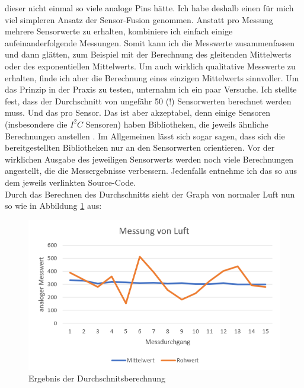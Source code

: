 \documentclass[10pt]{article}
\begin{document}
dieser nicht einmal so viele analoge Pins hätte. Ich habe deshalb einen für mich viel simpleren Ansatz der Sensor-Fusion genommen. Anstatt pro Messung mehrere Sensorwerte
zu erhalten, kombiniere ich einfach einige aufeinanderfolgende Messungen. Somit kann ich die Messwerte zusammenfassen und dann glätten, zum Beispiel mit der Berechnung des gleitenden Mittelwerts
oder des exponentiellen Mittelwerts. Um auch wirklich qualitative Messwerte zu erhalten, finde ich aber die Berechnung eines einzigen Mittelwerts  sinnvoller. Um das Prinzip in der Praxis zu testen, 
unternahm ich ein paar Versuche. Ich stellte fest, dass der Durchschnitt von ungefähr 50 (!) Sensorwerten berechnet werden muss. Und das
pro Sensor. Das ist aber akzeptabel, denn einige Sensoren (insbesondere die $I^2C$ Sensoren) haben Bibliotheken, die jeweils ähnliche 
Berechnungen anstellen \autocite{SGP40Library}. Im Allgemeinen lässt sich sogar sagen, dass sich die bereitgestellten Bibliotheken nur an den Sensorwerten orientieren. Vor der wirklichen
Ausgabe des jeweiligen Sensorwerts werden noch viele Berechnungen angestellt, die die Messergebnisse verbessern. Jedenfalls entnehme ich das so aus dem jeweils verlinkten Source-Code.\\
Durch das Berechnen des Durchschnitts sieht der Graph von normaler Luft nun so wie in Abbildung \ref{Ergebnis der Durchschnitsberechnung} aus:\\

\begin{figure}[H]
\centering
\includegraphics[scale=0.8]{Bilder/Messung_von_Luft.png}
\caption{Ergebnis der Durchschnitsberechnung}
\label{Ergebnis der Durchschnitsberechnung}
\end{figure} 
\end{document}
